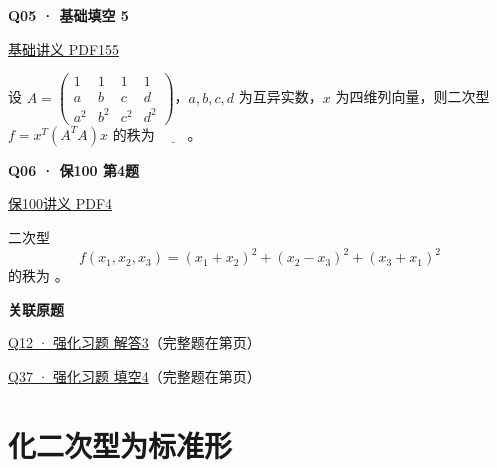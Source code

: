 \documentclass[UTF8,fontset=fandol,11pt,a4paper]{ctexart}
\newcommand{\source}[1]{{\footnotesize\color{Muted}#1\par}}
\newcommand{\qtitle}[2]{\par\needspace{5\baselineskip}\hypertarget{#1}{}\label{#1}\textbf{#2}\par}
\begin{document}
\begin{minipage}{\linewidth}
\qtitle{B-FB-05}{Q05 · 基础填空 5}
\source{\href{file:///Users/skyintelligence/Desktop/\%E5\%BE\%97\%E8\%AF\%BB\%E4\%B8\%AA\%E7\%A0\%94-\%E5\%8C\%97\%E5\%A4\%A7\%E8\%BD\%AF\%E5\%BE\%AE/\%E6\%95\%B0\%E5\%AD\%A6\%20150/\%E8\%AE\%B2\%E4\%B9\%89/\%E3\%80\%90\%E4\%B8\%80\%E9\%AB\%98\%E6\%95\%B0Kira\%E3\%80\%9127\%E8\%80\%83\%E7\%A0\%94\%E7\%BA\%BF\%E4\%BB\%A3\%E5\%9F\%BA\%E7\%A1\%80\%E8\%AE\%B2\%E4\%B9\%89\%26\%E4\%B9\%A0\%E9\%A2\%98-\%E7\%94\%B5\%E5\%AD\%90\%E7\%89\%88.pdf\#page=155}{基础讲义 PDF155}}
设 $A=\begin{pmatrix}1&1&1&1\\a&b&c&d\\a^2&b^2&c^2&d^2\end{pmatrix}$，$a,b,c,d$ 为互异实数，$x$ 为四维列向量，则二次型 $f=x^T(A^TA)x$ 的秩为 $\underline{\qquad}$。
\end{minipage}\par\vspace{7mm}
\begin{minipage}{\linewidth}
\qtitle{S-04}{Q06 · 保100 第4题}
\source{\href{file:///Users/skyintelligence/Desktop/\%E5\%BE\%97\%E8\%AF\%BB\%E4\%B8\%AA\%E7\%A0\%94-\%E5\%8C\%97\%E5\%A4\%A7\%E8\%BD\%AF\%E5\%BE\%AE/\%E6\%95\%B0\%E5\%AD\%A6\%20150/02\_\%E4\%B8\%93\%E9\%A1\%B9\%E5\%88\%B7\%E9\%A2\%98\_\%E4\%BF\%9D100/\%E7\%BA\%BF\%E6\%80\%A7\%E4\%BB\%A3\%E6\%95\%B0/\%E7\%BA\%BF\%E6\%80\%A7\%E4\%BB\%A3\%E6\%95\%B0\%E4\%B8\%93\%E9\%A1\%B9\%E5\%88\%B7\%E9\%A2\%98\%E8\%AF\%BE14-\%E4\%BA\%8C\%E6\%AC\%A1\%E5\%9E\%8B\%20\%E8\%AE\%B2\%E4\%B9\%89.pdf\#page=4}{保100讲义 PDF4}}
二次型\[f(x_1,x_2,x_3)=(x_1+x_2)^2+(x_2-x_3)^2+(x_3+x_1)^2\]的秩为 \underline{\hspace{2cm}}。
\end{minipage}\par\vspace{7mm}
\textbf{关联原题}\par
\hyperlink{R-LONG-03}{Q12 · 强化习题 解答3}（完整题在第\pageref*{R-LONG-03}页）\par
\hyperlink{R-FILL-04}{Q37 · 强化习题 填空4}（完整题在第\pageref*{R-FILL-04}页）\par
\clearpage
\section*{化二次型为标准形}
\end{document}
